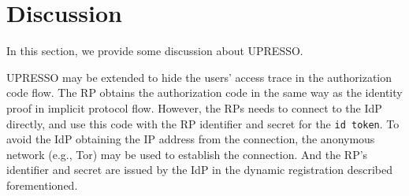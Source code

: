 \section{Discussion}
\label{sec:discussion}
In this section, we provide some discussion about UPRESSO.


 UPRESSO may be extended to hide the users' access trace in  the authorization code flow. The RP obtains the authorization code in the same way as the  identity proof in implicit protocol flow. However, the RPs needs to connect to the IdP directly, and  use this code with  the RP identifier and secret for the \verb+id token+. To avoid the IdP obtaining the IP address from the connection, the anonymous network (e.g., Tor) may be used to establish the connection. And the RP's identifier and secret are issued by the IdP in the dynamic registration described forementioned.


